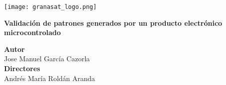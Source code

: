 \begin{titlepage}
    \setlength{\centeroffset}{-0.5\oddsidemargin}
    \addtolength{\centeroffset}{0.5\evensidemargin}
    \thispagestyle{empty}

    \noindent\hspace*{\centeroffset}

    \begin{minipage}{\textwidth}
        \centering
        \vspace{3.3cm}

        \texttt{[image: granasat\_logo.png]}
        \vspace{0.5cm}

        \Huge\bfseries Validación de patrones generados por un producto electrónico microcontrolado 
    \end{minipage}

    \vspace{2.5cm}
    \noindent\hspace*{\centeroffset}

    \begin{minipage}{\textwidth}
        \centering

        \textbf{Autor}\\{Jose Manuel García Cazorla}\\[2.5ex]
        \textbf{Directores}\\{Andrés María Roldán Aranda}\\[2cm]
    \end{minipage}

\end{titlepage}
